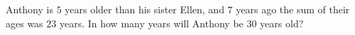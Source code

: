Anthony is $5$ years older than his sister Ellen, and $7$ years ago the sum of their ages was $23$ years. In how many years will Anthony be $30$ years old?
